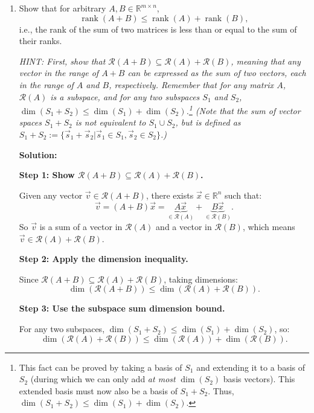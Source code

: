 \documentclass[10pt]{article}
\theoremstyle{definition}
\theoremstyle{plain}
\newcommand{\RR}{\mathbb{R}}
\newcommand{\Range}{\mathcal{R}}
\DeclareMathOperator{\rank}{rank}
\begin{document}
\begin{enumerate}[label=(\alph*)]
    \item Show that for arbitrary $A, B \in \RR^{m \times n}$,
    \begin{equation}
        \rank(A + B) \leq \rank(A) + \rank(B),
    \end{equation}
    i.e., the rank of the sum of two matrices is less than or equal to the sum of their ranks.

    \textit{HINT: First, show that $\Range(A + B) \subseteq \Range(A) + \Range(B)$, meaning that any vector in the range of $A + B$ can be expressed as the sum of two vectors, each in the range of $A$ and $B$, respectively. Remember that for any matrix $A$, $\Range(A)$ is a subspace, and for any two subspaces $S_1$ and $S_2$, $\dim(S_1 + S_2) \leq \dim(S_1) + \dim(S_2)$.\footnote{This fact can be proved by taking a basis of $S_1$ and extending it to a basis of $S_2$ (during which we can only add \textit{at most} $\dim(S_2)$ basis vectors). This extended basis must now also be a basis of $S_1 + S_2$. Thus, $\dim(S_1 + S_2) \leq \dim(S_1) + \dim(S_2)$.} (Note that the sum of vector spaces $S_1 + S_2$ is not equivalent to $S_1 \cup S_2$, but is defined as $S_1 + S_2 := \{\vec{s}_1 + \vec{s}_2 | \vec{s}_1 \in S_1, \vec{s}_2 \in S_2\}$.)}

    \textbf{Solution:}

    \textbf{Step 1: Show $\Range(A + B) \subseteq \Range(A) + \Range(B)$.}

    Given any vector $\vec{v} \in \Range(A + B)$, there exists $\vec{x} \in \RR^n$ such that:
    \begin{equation}
        \vec{v} = (A + B)\vec{x} = \underbrace{A\vec{x}}_{\in \Range(A)} + \underbrace{B\vec{x}}_{\in \Range(B)}.
    \end{equation}
    So $\vec{v}$ is a sum of a vector in $\Range(A)$ and a vector in $\Range(B)$, which means $\vec{v} \in \Range(A) + \Range(B)$.

    \textbf{Step 2: Apply the dimension inequality.}

    Since $\Range(A + B) \subseteq \Range(A) + \Range(B)$, taking dimensions:
    \begin{equation}
        \dim(\Range(A + B)) \leq \dim(\Range(A) + \Range(B)).
    \end{equation}

    \textbf{Step 3: Use the subspace sum dimension bound.}

    For any two subspaces, $\dim(S_1 + S_2) \leq \dim(S_1) + \dim(S_2)$, so:
    \begin{equation}
        \dim(\Range(A) + \Range(B)) \leq \dim(\Range(A)) + \dim(\Range(B)).
    \end{equation}


\end{enumerate}
\end{document}
